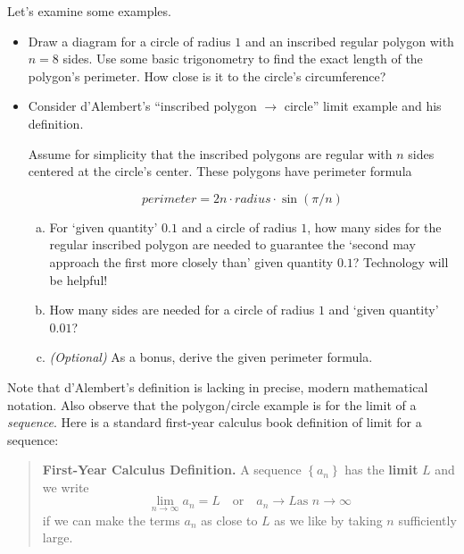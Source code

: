 \documentclass[11pt]{article}%
\newcounter{tasknumb}
\newcommand{\tasknumb}[1]{\refstepcounter{tasknumb}\textmd{\textbf{$\fbox{$\fbox{Task \thetasknumb}$}$}}#1}
\newenvironment{task}[1][]%
{\begin{itemize}
\item[\tasknumb{#1}] }
{
\end{itemize} }%
\begin{document}
\noindent Let's examine some examples.

\begin{task}
Draw a diagram for a circle of radius $1$ and an inscribed regular polygon
with $n=8$ sides. Use some basic trigonometry to find the exact length of the
polygon's perimeter. How close is it to the circle's circumference?

\medskip
\end{task}


\begin{task}[\label{Inscribed}]
Consider d'Alembert's ``inscribed polygon $\rightarrow$ circle'' limit example and his
definition.

Assume for simplicity that the inscribed polygons are regular with $n$ sides centered at
the circle's center. These polygons have perimeter formula%

\[ perimeter=2n\cdot radius\cdot\sin\left(  \pi/n\right)  \]


\begin{enumerate}[(a)]

\item For `\textsf{given quantity}' $0.1$ and a circle of radius $1$,
how many sides for the regular inscribed polygon are needed to guarantee the
`\textsf{second may approach  the first more closely than}' given quantity $0.1$?
Technology will be helpful!
\item How many sides are needed for a circle of radius $1$ and `\textsf{given quantity}'
$0.01$?
\item \emph{(Optional)} As a bonus, derive the given perimeter formula.
\end{enumerate}
\end{task}




Note that d'Alembert's definition is lacking in precise, modern mathematical notation.
Also observe that the polygon/circle example is for the limit of a
\textit{sequence}. Here is a standard first-year calculus book definition of
limit for a sequence:

\begin{quote}
\textbf{First-Year Calculus Definition.} A sequence $\left\{
a_{n}\right\}  $ has the \textbf{limit} $L$ and we write%
\[
\lim_{n\rightarrow\infty}a_{n}=L\quad\text{or}\quad a_{n}\rightarrow L\text{
as }n\rightarrow\infty
\]
if we can make the terms $a_{n}$ as close to $L$ as we like by taking $n$
sufficiently large.
\end{quote}
\end{document}
